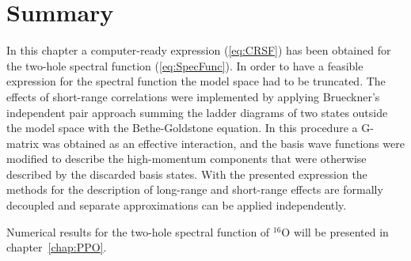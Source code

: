 \section{Summary}
In this chapter a computer-ready expression (\ref{eq:CRSF}) has been 
obtained for the two-hole spectral function (\ref{eq:SpecFunc}). In 
order to have a feasible expression for the spectral function the 
model space had to be truncated. The effects of short-range correlations were 
implemented by applying Brueckner's independent pair approach
summing the ladder diagrams of two states outside the model space with the
Bethe-Goldstone equation. In this procedure
a G-matrix was obtained as an effective interaction, and 
the basis wave functions were modified to describe the high-momentum 
components that were otherwise described by the discarded basis 
states.
With the presented expression the methods for the description of long-range 
and short-range effects are formally decoupled and separate approximations can 
be applied independently. 

Numerical results for the two-hole spectral function of $^{16}$O will
be presented in chapter~\ref{chap:PPO}.
